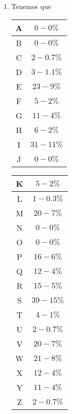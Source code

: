 \documentclass[letterpaper,11pt]{article}
\begin{document}
\begin{enumerate}
\begin{enumerate}
\begin{enumerate}
            \item Tenemos que
            \begin{center}
                \begin{tabular}{|c|c|}
                \hline
                A & $0-0\%$ \\ \hline
                B & $0-0\%$ \\ \hline
                C & $2-0.7\%$ \\ \hline
                D & $3-1.1\%$ \\ \hline
                E & $23-9\%$ \\ \hline
                F & $5-2\%$ \\ \hline
                G & $11-4\%$ \\ \hline
                H & $6-2\%$ \\ \hline
                I & $31-11\%$ \\ \hline
                J & $0-0\% $ \\ \hline
                \end{tabular}
            \end{center} 

            \begin{center}
                \begin{tabular}{|c|c|}
                \hline
                K & $5-2\%$ \\ \hline
                L & $1-0.3\%$ \\ \hline
                M & $20-7\%$ \\ \hline
                N & $0-0\%$ \\ \hline
                O & $0-0\%$ \\ \hline
                P & $16-6\%$\\ \hline
                Q & $12-4\%$ \\ \hline
                R & $15-5\%$ \\ \hline
                S & $39-15\%$ \\ \hline
                T & $4-1\%$ \\ \hline
                U & $2-0.7\%$ \\ \hline
                V & $20-7\%$ \\ \hline
                W & $21-8\%$ \\ \hline
                X & $12-4\%$ \\ \hline
                Y & $11-4\%$ \\ \hline
                Z & $2-0.7\%$ \\ \hline
                \end{tabular}
            \end{center}


\end{enumerate}
\end{enumerate}
\end{enumerate}
\end{document}
